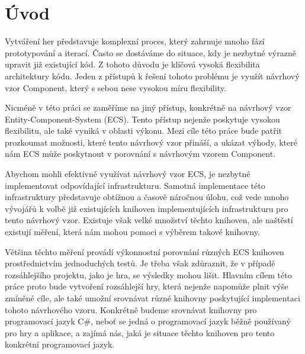 \chapter{Úvod}
Vytváření her představuje komplexní proces, který zahrnuje mnoho fází prototypování a iterací. Často se dostáváme do situace, kdy je nezbytné výrazně upravit již existující kód. Z tohoto důvodu je klíčová vysoká flexibilita architektury kódu. Jeden z přístupů k řešení tohoto problému je využít návrhový vzor Component, který s sebou nese vysokou míru flexibility.

Nicméně v této práci se zaměříme na jiný přístup, konkrétně na návrhový vzor Entity-Component-System (ECS). Tento přístup nejenže poskytuje vysokou flexibilitu, ale také vyniká v oblasti výkonu. Mezi cíle této práce bude patřit prozkoumat možnosti, které tento návrhový vzor přináší, a ukázat výhody, které nám ECS může poskytnout v porovnání s návrhovým vzorem Component.

Abychom mohli efektivně využívat návrhový vzor ECS, je nezbytné implementovat odpovídající infrastrukturu. Samotná implementace této infrastruktury představuje obtížnou a časově náročnou úlohu, což vede mnoho vývojářů k volbě již existujících knihoven implementujících infrastrukturu pro tento návrhový vzor. Existuje však velké množství těchto knihoven, ale naštěstí existují měření, která nám mohou pomoci s výběrem takové knihovny.

Většina těchto měření provádí výkonnostní porovnání různých ECS knihoven prostřednictvím jednoduchých testů. Je třeba však zdůraznit, že v případě rozsáhlejšího projektu, jako je hra, se výsledky mohou lišit. Hlavním cílem této práce proto bude vytvoření rozsáhlejší hry, která nejenže napomůže plnit výše zmíněné cíle, ale také umožní srovnávat různé knihovny poskytující implementaci tohoto návrhového vzoru. Konkrétně budeme srovnávat knihovny pro programovací jazyk C\#, neboť se jedná o programovací jazyk běžně používaný pro hry a aplikace, a zajímá nás, jaká je situace těchto knihoven pro tento konkrétní programovací jazyk.


